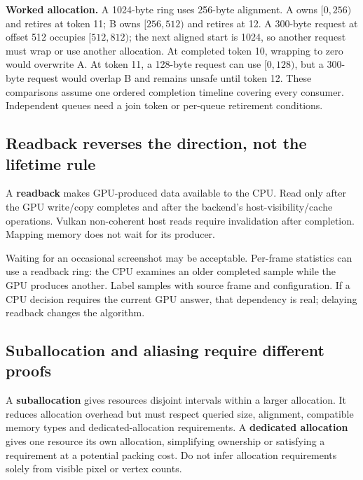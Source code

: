 \textbf{Worked allocation.} A 1024-byte ring uses 256-byte alignment. A owns \([0,256)\) and retires at token 11; B owns \([256,512)\) and retires at 12. A 300-byte request at offset 512 occupies \([512,812)\); the next aligned start is 1024, so another request must wrap or use another allocation. At completed token 10, wrapping to zero would overwrite A. At token 11, a 128-byte request can use \([0,128)\), but a 300-byte request would overlap B and remains unsafe until token 12. These comparisons assume one ordered completion timeline covering every consumer. Independent queues need a join token or per-queue retirement conditions.

\subsection{Readback reverses the direction, not the lifetime rule}\label{03-visual-computing-i-ch016-readback-reverses-the-direction-not-the-lifetime-rule}

\hypertarget{03-visual-computing-i-ch016-readback-reverses-the-direction-not-the-lifetime-rule}{}

A \textbf{readback} makes GPU-produced data available to the CPU. Read only after the GPU write/copy completes and after the backend's host-visibility/cache operations. Vulkan non-coherent host reads require invalidation after completion. Mapping memory does not wait for its producer.

Waiting for an occasional screenshot may be acceptable. Per-frame statistics can use a readback ring: the CPU examines an older completed sample while the GPU produces another. Label samples with source frame and configuration. If a CPU decision requires the current GPU answer, that dependency is real; delaying readback changes the algorithm.

\subsection{Suballocation and aliasing require different proofs}\label{03-visual-computing-i-ch016-suballocation-and-aliasing-require-different-proofs}

\hypertarget{03-visual-computing-i-ch016-suballocation-and-aliasing-require-different-proofs}{}

A \textbf{suballocation} gives resources disjoint intervals within a larger allocation. It reduces allocation overhead but must respect queried size, alignment, compatible memory types and dedicated-allocation requirements. A \textbf{dedicated allocation} gives one resource its own allocation, simplifying ownership or satisfying a requirement at a potential packing cost. Do not infer allocation requirements solely from visible pixel or vertex counts.

